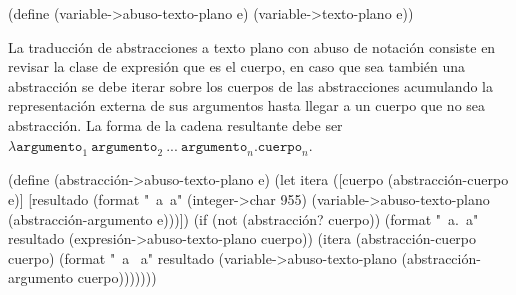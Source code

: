 \documentclass[letterpaper,twoside,openright,11pt]{book}
\begin{document}
\nwenddocs{}\plusendmoddef
(define (variable->abuso-texto-plano e)
  (variable->texto-plano e))

\eatline
{}\nwendcode{}\nwdocspar

La traducción de abstracciones a texto plano con abuso de notación consiste en revisar la clase de expresión que es el cuerpo, en caso que sea también una abstracción se debe iterar sobre los cuerpos de las abstracciones acumulando la representación externa de sus argumentos hasta llegar a un cuerpo que no sea abstracción. La forma de la cadena resultante debe ser \( λ\mathtt{argumento}_{1}\ \mathtt{argumento}_{2}\ ...\ \mathtt{argumento}_{n}.\mathtt{cuerpo}_{n} \).

\nwenddocs{}\plusendmoddef
(define (abstracción->abuso-texto-plano e)
  (let itera ([cuerpo (abstracción-cuerpo e)]
              [resultado (format "~a~a"
                                 (integer->char 955)
                                 (variable->abuso-texto-plano (abstracción-argumento e)))])
    (if (not (abstracción? cuerpo))
        (format "~a.~a" resultado (expresión->abuso-texto-plano cuerpo))
        (itera (abstracción-cuerpo cuerpo)
               (format "~a ~a"
                       resultado
                       (variable->abuso-texto-plano (abstracción-argumento cuerpo)))))))

\eatline
{}\nwendcode{}\nwdocspar
\end{document}
